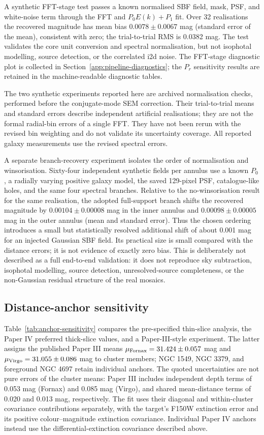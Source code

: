 \documentclass[nodoi,nocopyright]{pas}
\begin{document}
A synthetic FFT-stage test passes a known normalised SBF field, mask, PSF,
and white-noise term through the FFT and $P_0E(k)+P_1$ fit. Over 32
realisations the recovered magnitude has mean bias
$0.0078\pm0.0067$ mag (standard error of the mean), consistent with zero; the
trial-to-trial RMS is 0.0382 mag. The test validates the core unit conversion
and spectral normalisation, but not isophotal modelling, source detection, or
the correlated i2d noise. The FFT-stage diagnostic plot is
collected in Section~\ref{app:pipeline-diagnostics}; the $P_r$ sensitivity
results are retained in the machine-readable diagnostic tables.

The two synthetic experiments reported here are archived normalisation
checks, performed before the conjugate-mode SEM correction. Their
trial-to-trial means and standard errors describe independent artificial
realisations; they are not the formal radial-bin errors of a single FFT.
They have not been rerun with the revised bin weighting and do not validate
its uncertainty coverage. All reported galaxy measurements use the revised
spectral errors.

A separate branch-recovery experiment isolates the order of normalisation and
winsorisation.  Sixty-four independent synthetic fields per annulus use a
known $P_0$, a radially varying positive galaxy model, the saved 129-pixel
PSF, catalogue-like holes, and the same four spectral branches.  Relative to
the no-winsorisation result for the same realisation, the adopted
full-support branch shifts the recovered magnitude by
$0.00104\pm0.00008$ mag in the inner annulus and
$0.00098\pm0.00005$ mag in the outer annulus (mean and standard error).
Thus the chosen ordering introduces a small but statistically resolved
additional shift of about 0.001 mag for an injected Gaussian SBF field.
Its practical size is small compared with the distance errors; it is not
evidence of exactly zero bias.  This is deliberately not described as a full
end-to-end validation: it does not reproduce sky subtraction, isophotal
modelling, source detection, unresolved-source completeness, or the
non-Gaussian residual structure of the real mosaics.

\subsection{Distance-anchor sensitivity}

Table~\ref{tab:anchor-sensitivity} compares the pre-specified thin-slice
analysis, the Paper IV preferred thick-slice values, and a Paper-III-style
experiment. The latter assigns the published Paper III means
$\mu_{\rm Fornax}=31.424\pm0.057$ mag and
$\mu_{\rm Virgo}=31.055\pm0.086$ mag to cluster members; NGC 1549,
NGC 3379, and foreground NGC 4697 retain individual anchors.
The quoted uncertainties are not pure errors of the cluster means:
Paper III includes independent depth terms of 0.053 mag (Fornax) and
0.085 mag (Virgo), and shared mean-distance terms of 0.020 and 0.013 mag,
respectively. The fit uses their diagonal and within-cluster covariance
contributions separately, with the target's F150W extinction error and its
positive colour--magnitude extinction covariance. Individual Paper IV
anchors instead use the differential-extinction covariance described above.
\end{document}

